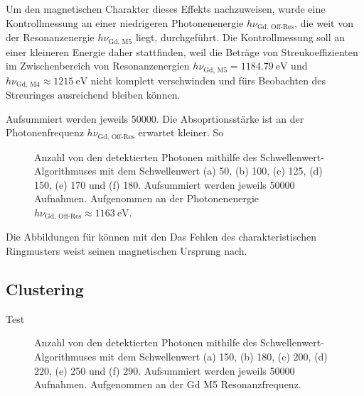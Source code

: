 \noindent
Um den magnetischen Charakter dieses Effekts nachzuweisen, wurde eine Kontrollmessung an einer niedrigeren Photonenenergie $h\nu_{\text{Gd, Off-Res}}$, die weit von der Resonanzenergie $h\nu_{\text{Gd, M5}}$ liegt, durchgeführt. Die Kontrollmessung soll an einer kleineren Energie daher stattfinden, weil die Beträge von Streukoeffizienten im Zwischenbereich von Resonanzenergien $h\nu_{\text{Gd, M5}} = \SI{1184,79}{\eV}$ und $h\nu_{\text{Gd, M4}} \approx \SI{1215}{\eV}$ nicht komplett verschwinden und fürs Beobachten des Streuringes ausreichend bleiben können.

\noindent
Aufsummiert werden jeweils \SI{50000}{\captures}. Die Absoprtionsstärke ist an der Photonenfrequenz $h\nu_{\text{Gd, Off-Res}}$ erwartet kleiner. So  
\begin{figure}[H]
    \centering
    
    \caption{Anzahl von den detektierten Photonen mithilfe des Schwellenwert-Algorithmuses mit dem Schwellenwert (a) \SI{50}{\adu}, (b) \SI{100}{\adu}, (c) \SI{125}{\adu}, (d) \SI{150}{\adu}, (e) \SI{170}{\adu} und (f) \SI{180}{\adu}. Aufsummiert werden jeweils \num{50000} Aufnahmen. Aufgenommen an der Photonenenergie $h\nu_\text{Gd, Off-Res} \approx \SI{1163}{\eV}$.}
    \label{fig:th_50_100_125_150_170_180_off_resonance}
\end{figure}
Die Abbildungen für können mit den 
Das Fehlen des charakteristischen Ringmusters weist seinen magnetischen Ursprung nach.





\subsection{Clustering}
\noindent
Test
\begin{figure}[H]
    \centering
    
    \caption{Anzahl von den detektierten Photonen mithilfe des Schwellenwert-Algorithmuses mit dem Schwellenwert (a) \SI{150}{\adu}, (b) \SI{180}{\adu}, (c) \SI{200}{\adu}, (d) \SI{220}{\adu}, (e) \SI{250}{\adu} und (f) \SI{290}{\adu}. Aufsummiert werden jeweils \num{50000} Aufnahmen. Aufgenommen an der Gd M5 Resonanzfrequenz.}
    \label{fig:cl_2_0_100_125_150_170_180_resonance}
\end{figure}

